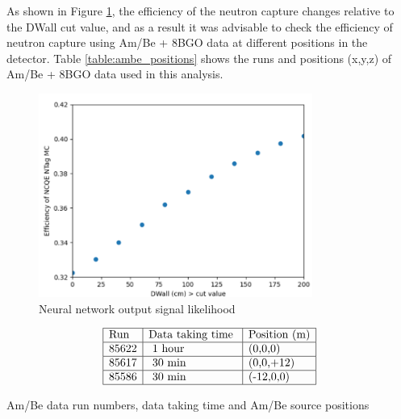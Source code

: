 As shown in Figure \ref{fig:efficiency_dwall}, the efficiency of the neutron capture changes relative to the DWall cut value, and as a result it was advisable to check the efficiency of neutron capture using Am/Be + 8BGO data at different positions in the detector. Table \ref{table:ambe_positions} shows the runs and positions (x,y,z) of Am/Be + 8BGO data used in this analysis.

\begin{figure}
    \centering
    \includegraphics[width=0.8\textwidth]{Figures/efficiency_dwall.png}
    \caption{Neural network output signal likelihood }
    \label{fig:efficiency_dwall}
\end{figure}


\begin{table}
    $$
    \begin{array}{|l|l|l|l|l|}
    \hline \text{Run} & \text {Data taking time } & \text{Position (m)} \\
    \hline 85622 & \text { 1 hour} & \text{(0,0,0)} \\
    \hline 85617 & \text { 30 min} & \text{(0,0,+12)} \\
    \hline 85586 & \text { 30 min} & \text{(-12,0,0)} \\
    \hline
    \end{array}
    $$
    \caption{Am/Be data run numbers, data taking time and Am/Be source positions}
    \label{table:ambe_positions}
\end{table}

